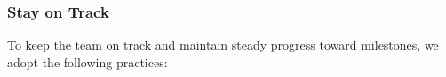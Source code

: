 \documentclass{article}
\begin{document}
\subsubsection*{Stay on Track}



To keep the team on track and maintain steady progress toward milestones, we adopt the following practices:
\end{document}
